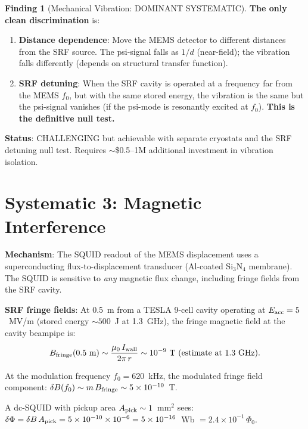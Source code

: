 \documentclass[11pt]{article}
\newcommand{\ee}[1]{\times 10^{#1}}
\theoremstyle{definition}
\newtheorem{finding}[theorem]{Finding}
\theoremstyle{remark}
\begin{document}
\begin{finding}[Mechanical Vibration: DOMINANT SYSTEMATIC]
\textbf{The only clean discrimination} is:
\begin{enumerate}[nosep]
\item \textbf{Distance dependence}: Move the MEMS detector to
  different distances from the SRF source. The psi-signal falls
  as $1/d$ (near-field); the vibration falls differently (depends
  on structural transfer function).
\item \textbf{SRF detuning}: When the SRF cavity is operated at a
  frequency far from the MEMS $f_0$, but with the same stored
  energy, the vibration is the same but the psi-signal vanishes
  (if the psi-mode is resonantly excited at $f_0$).
  \textbf{This is the definitive null test.}
\end{enumerate}

\textbf{Status}: \textcolor{conjcolor}{CHALLENGING but achievable
with separate cryostats and the SRF detuning null test. Requires
$\sim$\$0.5--1M additional investment in vibration isolation.}
\end{finding}


\section{Systematic 3: Magnetic Interference}
\label{sec:magnetic}

\textbf{Mechanism}: The SQUID readout of the MEMS displacement uses
a superconducting flux-to-displacement transducer (Al-coated Si$_3$N$_4$
membrane). The SQUID is sensitive to \emph{any} magnetic flux change,
including fringe fields from the SRF cavity.

\textbf{SRF fringe fields}: At 0.5~m from a TESLA 9-cell cavity
operating at $E_{\rm acc} = 5$~MV/m (stored energy $\sim 500$~J at
1.3~GHz), the fringe magnetic field at the cavity beampipe is:
\begin{equation}
B_{\rm fringe}(0.5~\text{m}) \sim
\frac{\mu_0\,I_{\rm wall}}{2\pi\,r}
\sim 10^{-9}~\text{T (estimate at 1.3~GHz)}.
\end{equation}

At the modulation frequency $f_0 = 620$~kHz, the modulated fringe
field component:
$\delta B(f_0) \sim m\,B_{\rm fringe} \sim 5\ee{-10}$~T.

A dc-SQUID with pickup area $A_{\rm pick} \sim 1$~mm$^2$ sees:
$\delta\Phi = \delta B\,A_{\rm pick} = 5\ee{-10}\times 10^{-6}
= 5\ee{-16}$~Wb $= 2.4\ee{-1}\,\Phi_0$.
\end{document}
